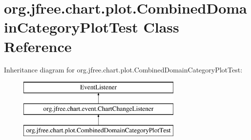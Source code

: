 \hypertarget{classorg_1_1jfree_1_1chart_1_1plot_1_1_combined_domain_category_plot_test}{}\section{org.\+jfree.\+chart.\+plot.\+Combined\+Domain\+Category\+Plot\+Test Class Reference}
\label{classorg_1_1jfree_1_1chart_1_1plot_1_1_combined_domain_category_plot_test}
Inheritance diagram for org.\+jfree.\+chart.\+plot.\+Combined\+Domain\+Category\+Plot\+Test\+:\begin{figure}[H]
\begin{center}
\leavevmode
\includegraphics[height=3.000000cm]{classorg_1_1jfree_1_1chart_1_1plot_1_1_combined_domain_category_plot_test}
\end{center}
\end{figure}
